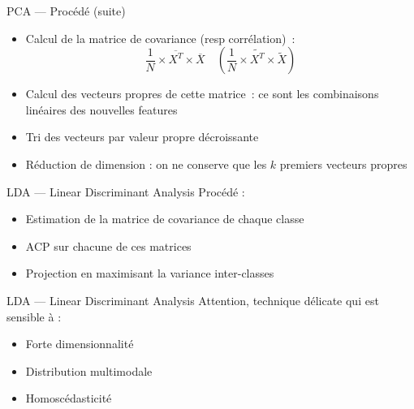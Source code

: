 \begin{frame}{PCA --- Procédé (suite)}
  \begin{itemize}[<+->]
    \item Calcul de la matrice de covariance (resp corrélation)~:
      \[
      \frac{1}{N} \times \overline{X^T} \times \overline{X}
      \quad
      ( \frac{1}{N} \times \widetilde{X^T} \times \widetilde{X} )
      \]
    \item Calcul des vecteurs propres de cette matrice~: ce sont les combinaisons linéaires des nouvelles features
    \item Tri des vecteurs par valeur propre décroissante
    \item Réduction de dimension : on ne conserve que les $k$ premiers vecteurs propres
  \end{itemize}
\end{frame}

\begin{frame}{LDA --- Linear Discriminant Analysis}
  Procédé : \\
  \begin{itemize}
    \item Estimation de la matrice de covariance de chaque classe
    \item ACP sur chacune de ces matrices
    \item Projection en maximisant la variance inter-classes
  \end{itemize}
\end{frame}

\begin{frame}{LDA --- Linear Discriminant Analysis}
  Attention, technique délicate qui est sensible à : \\
  \begin{itemize}
    \item Forte dimensionnalité
    \item Distribution multimodale
    \item Homoscédasticité
  \end{itemize}
\end{frame}
